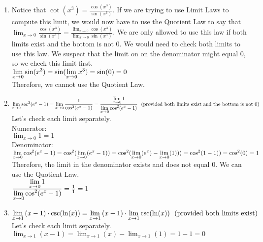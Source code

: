 \documentclass{ximera}
\begin{document}
\begin{question}
\begin{feedback}
\begin{enumerate}
    \item Notice that $\cot(x^3) = \frac{\cos(x^3)}{\sin(x^3)}$.  If we are trying to use Limit Laws to compute this limit, we would now have to use the Quotient Law to say that $\lim_{x\to 0} \frac{\cos(x^3)}{\sin(x^3)}
    = \frac{\lim_{x\to 0} \cos(x^3)}{\lim_{x\to 0} \sin(x^3)}$.  We are only allowed to use this law if both limits exist and the bottom is not 0. We would need to check both limits to use this law.  We suspect that the limit on on the denominator might equal 0, so we check this limit first.\\
    $\lim_{x\to 0} \sin(x^3)\\
    = \sin(\lim_{x\to 0}x^3)\\
    =\sin(0)=0$ \\
    Therefore, we cannot use the Quotient Law.
      
    \item $\lim_{x\to 0} \sec^2(e^x-1) \\
    = \lim_{x\to 0} \frac{1}{\cos^2(e^x-1)} \\
   = \frac{ \lim_{x\to 0}1}{ \lim_{x\to 0}\cos^2(e^x-1)} \text{\ \ (provided both limits exist and the bottom is not 0)}$\\
   Let's check each limit separately.\\
   Numerator:\\
   $\lim_{x\to 0}1=1$\\
   Denominator:\\
   $\lim_{x\to 0}\cos^2(e^x-1)\\
   = \cos^2(\lim_{x\to 0}(e^x-1))\\
   = \cos^2(\lim_{x\to 0}(e^x)-\lim_{x\to 0}(1)))\\
   = \cos^2(1-1))\\
   = \cos^2(0)=1$\\
   Therefore, the limit in the denominator exists and does not equal 0.  We can use the Quotient Law.\\
   $\frac{ \lim_{x\to 0}1}{ \lim_{x\to 0}\cos^2(e^x-1)} = \frac{1}{1}=1\\ $
   
   \item $\lim_{x\to 1}{(x-1)\cdot \csc(\ln(x))} \\
   = \lim_{x\to 1}{(x-1)\cdot \lim_{x\to 1}\csc(\ln(x))} \text{\ \ (provided both limits exist)}$\\
   Let's check each limit separately.  \\
   $\lim_{x\to 1} (x-1) = \lim_{x\to 1} (x)-\lim_{x\to 1}(1)=1-1=0$\\
   

\end{enumerate}
\end{feedback}
\end{question}
\end{document}
